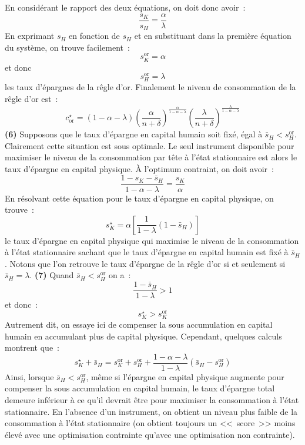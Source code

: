 \documentclass[10pt,a4paper,notitlepage,twocolumn]{article}
\newcommand{\question}[1]{\textbf{(#1)}}
\begin{document}
En considérant le rapport des deux équations, on doit donc avoir :
\[
\frac{s_K}{s_H} = \frac{\alpha}{\lambda}
\]
En exprimant $s_H$ en fonction de $s_H$ et en substituant dans la première équation du système, on trouve facilement :
\[
s_K^{\mathrm{or}} = \alpha
\]
et donc
\[
s_H^{\mathrm{or}} = \lambda
\]
les taux d'épargnes de la rêgle d'or. Finalement le niveau de consommation de la rêgle d'or est :
\[
c_{\mathrm{or}}^{\star} = (1-\alpha-\lambda)\left(\frac{\alpha}{n+\delta}\right)^{\frac{\alpha}{1-\alpha-\lambda}}\left(\frac{\lambda}{n+\delta}\right)^{\frac{\lambda}{1-\alpha-\lambda}}
\]
\question{6} Supposons que le taux d'épargne en capital humain soit
fixé, égal à $\bar{s}_{H}<s_{H}^{\mathrm{or}}$. Clairement cette
situation est sous optimale. Le seul instrument disponible pour
maximiser le niveau de la consommation par tête à l'état stationnaire
est alors le taux d'épargne en capital physique. À l'optimum contraint, on doit avoir :
\[
\frac{1-s_K-\bar{s}_H}{1-\alpha-\lambda} = \frac{s_K}{\alpha}
\]
En résolvant cette équation pour le taux d'épargne en capital physique, on trouve :
\[
s_K^{\star} = \alpha \left[\frac{1}{1-\lambda}(1-\bar{s}_H)\right]
\]
le taux d'épargne en capital physique qui maximise le niveau de la
consommation à l'état stationnaire sachant que le taux d'épargne en
capital humain est fixé à $\bar{s}_H$. Notons que l'on retrouve le
taux d'épargne de la rêgle d'or si et seulement si
$\bar{s}_H=\lambda$. \question{7} Quand $\bar{s}_H<s_H^{\mathrm{or}}$ on a :
\[
\frac{1-\bar{s}_H}{1-\lambda}>1
\]
et donc :
\[
s_K^{\star}>s_K^{\mathrm{or}}
\]
Autrement dit, on essaye ici de compenser la sous accumulation en
capital humain en accumulant plus de capital physique. Cependant, quelques calculs montrent que :
\[
s_K^{\star}+\bar{s}_H = s_K^{\mathrm{or}}+s_H^{\mathrm{or}} + \frac{1-\alpha-\lambda}{1-\lambda}\left(\bar{s}_H-s_H^{\mathrm{or}}\right) 
\]
Ainsi, lorsque $\bar{s}_H<s_H^{\mathrm{or}}$, même si l'épargne en
capital physique augmente pour compenser la sous accumulation en
capital humain, le taux d'épargne total demeure inférieur à ce qu'il
devrait être pour maximiser la consommation à l'état stationnaire. En
l'absence d'un instrument, on obtient un niveau plus faible de la
consommation à l'état stationnaire (on obtient toujours un <<~score~>>
moins élevé avec une optimisation contrainte qu'avec une optimisation
non contrainte).
\end{document}
